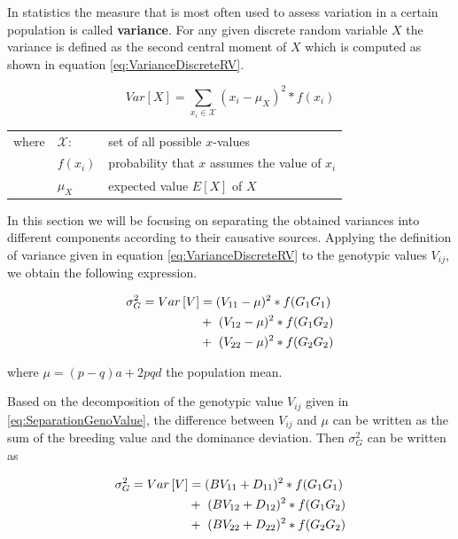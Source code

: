 \documentclass[
]{book}
\theoremstyle{definition}
\theoremstyle{definition}
\theoremstyle{definition}
\theoremstyle{remark}
\begin{document}
In statistics the measure that is most often used to assess variation in a certain population is called \textbf{variance}. For any given discrete random variable \(X\) the variance is defined as the second central moment of \(X\) which is computed as shown in equation \eqref{eq:VarianceDiscreteRV}.

\begin{equation}
Var\left[X\right] = \sum_{x_i \in \mathcal{X}} (x_i - \mu_X)^2 * f(x_i)
\label{eq:VarianceDiscreteRV}
\end{equation}

\vspace*{1ex}

\begin{tabular}{p{1cm}p{1cm}p{6cm}}
  where & $\mathcal{X}$: &  set of all possible $x$-values\\
        & $f(x_i)$       &  probability that $x$ assumes the value of $x_i$ \\
        & $\mu_X $       &  expected value $E\left[X\right]$ of $X$
  \end{tabular}

\vspace*{2ex}

In this section we will be focusing on separating the obtained variances into different components according to their causative sources. Applying the definition of variance given in equation \eqref{eq:VarianceDiscreteRV} to the genotypic values \(V_{ij}\), we obtain the following expression.

\begin{align}
\sigma_G^2 = Var\left[V\right] &=   (V_{11} - \mu)^2 * f(G_1G_1) \notag \\
                               &  +\  (V_{12} - \mu)^2 * f(G_1G_2) \notag \\
                               &  +\  (V_{22} - \mu)^2 * f(G_2G_2)
\label{eq:VarianceGenotypicValue}
\end{align}

where \(\mu = (p - q)a + 2pqd\) the population mean.

Based on the decomposition of the genotypic value \(V_{ij}\) given in \eqref{eq:SeparationGenoValue}, the difference between \(V_{ij}\) and \(\mu\) can be written as the sum of the breeding value and the dominance deviation. Then \(\sigma_G^2\) can be written as

\begin{align}
\sigma_G^2 = Var\left[V\right] &=   (BV_{11} + D_{11})^2 * f(G_1G_1) \notag \\
                               &  +\  (BV_{12} + D_{12})^2 * f(G_1G_2) \notag \\
                               &  +\  (BV_{22} + D_{22})^2 * f(G_2G_2)
\label{eq:GeneticVarianceBVDom}
\end{align}
\end{document}
